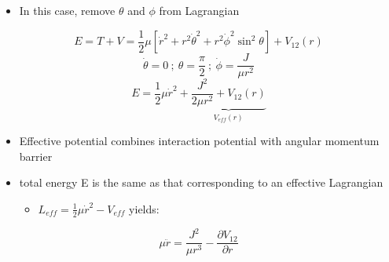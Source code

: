 \documentclass[a4paper,11pt,normalem]{article}
\begin{document}
\begin{itemize}
\item
  In this case, remove \(\theta\) and \(\phi\) from Lagrangian
\end{itemize}

\[
    E = T + V = \frac{1}{2}\mu[\dot{r}^2 + r^2\dot{\theta}^2 + r^2\dot{\phi}^2\sin^2\theta] + V_{12}(r) \]
\[
    \dot{\theta} = 0 ~;~ \theta = \frac{\pi}{2} ~;~ \dot{\phi} = \frac{J}{\mu r^2} \]
\[
    E = \frac{1}{2}\mu \dot{r}^2 + \underbrace{\frac{J^2}{2\mu r^2} + V_{12}(r)}_{V_{eff}(r)}
\]

\begin{itemize}
\item
  Effective potential combines interaction potential with angular
  momentum barrier
\item
  total energy E is the same as that corresponding to an effective
  Lagrangian
  \begin{itemize}
  \item \(L_{eff} = \frac{1}{2}\mu \dot{r}^2 - V_{eff}\) yields:
  \end{itemize}
\end{itemize}

\[
    \mu \ddot{r} = \frac{J^2}{\mu r^3} - \frac{\partial V_{12}}{\partial r}
\]
\end{document}
